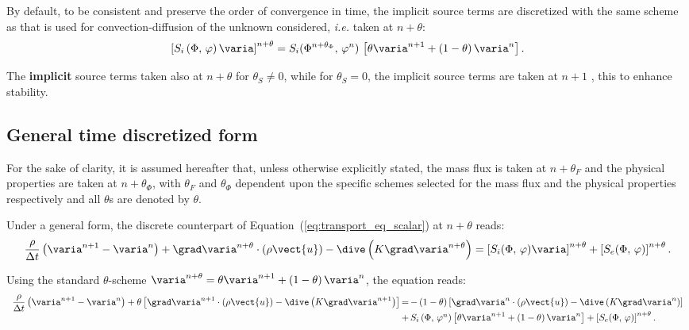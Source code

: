 By default, to be consistent and preserve the order of convergence in time,
the implicit source terms are discretized with the same scheme as that is used
for convection-diffusion of the unknown considered, \emph{i.e.} taken at 
$n+\theta $:
\begin{equation}
\left[ S_{i} \left(\Phi , \, \varphi \right) \varia \right]^{n+\theta }
= S_{i}(\Phi^{n+\theta _{\Phi}} , \, \varphi^{n}) \,\left[ \theta \varia^{n+1}+\left(1-\theta \right)\varia^{n} \right].
\end{equation}

\begin{remark}
The \textbf{implicit} source terms taken also at $n+\theta $ for $\theta
_{S}\neq 0$, while for $\theta _{S}=0$, the implicit source terms are taken
at $n+1$ , this to enhance stability.
\end{remark}

\subsection{General time discretized form}

For the sake of clarity, it is assumed hereafter that, unless otherwise
explicitly stated, the mass flux is taken at $n+\theta_F$ and the physical
properties are taken at $n+\theta_\Phi$, with $\theta_F$ and $\theta_\Phi$
dependent upon the specific schemes selected for the mass flux and the
physical properties respectively and all $\theta$s are denoted by $\theta$.

Under a general form, the discrete counterpart of Equation~(\ref{eq:transport_eq_scalar}) at
$n+\theta$ reads:
\begin{equation}
\displaystyle \dfrac{\rho}{\Delta t} \left(\varia^{n+1}-\varia^{n}\right)
+ \grad\varia^{n+\theta} \cdot \left(\rho \vect{u} \right)
- \dive \left( K \grad \varia^{n+\theta} \right) =
\left[ S_{i}(\Phi, \, \varphi) \varia \right]^{n+\theta} + \left[S_{e}(\Phi, \, \varphi) \right]^{n+\theta} .
\end{equation}

Using the standard $\theta$-scheme $\varia^{n+\theta}=\theta \varia^{n+1}+\left(1-\theta \right)
\varia^{n}$, the equation reads:
\begin{equation}
\begin{array}{r @{\,} c @{\,} l}
\displaystyle \dfrac{\rho}{\Delta t} \left( \varia^{n+1}-\varia^{n} \right)
+ \theta \left[ 
\grad \varia^{n+1} \cdot \left( \rho \vect{u} \right) 
- \dive \left( K \grad \varia^{n+1} \right)   \right]
&=& 
- \left(1-\theta\right) \left[ 
\grad \varia^{n} \cdot \left( \rho \vect{u} \right) 
- \dive \left( K \grad \varia^{n}\right) 
\right]
 \\
&+& S_{i}\left(\Phi , \,\varphi^n\right)\left[\theta \varia^{n+1}+ \left(1-\theta \right) \varia^{n}\right] 
+ \left[ S_{e}(\Phi, \, \varphi)\right]^{n+\theta}.
\end{array}
\end{equation}

